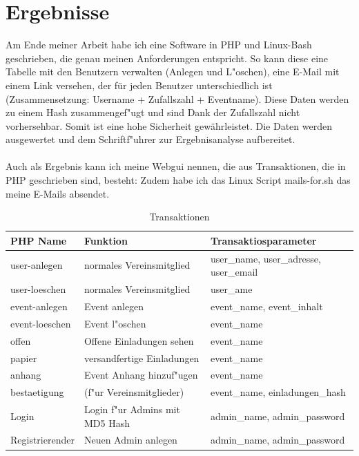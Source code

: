 \documentclass[12pt,twoside]{article}  %
\begin{document}
  \section{Ergebnisse} %
    Am Ende meiner Arbeit habe
    ich eine Software in PHP und Linux-Bash geschrieben, die genau meinen Anforderungen entspricht. 
    So kann diese eine Tabelle mit den Benutzern verwalten (Anlegen und L"oschen), eine E-Mail mit einem 
    Link versehen, der für jeden Benutzer unterschiedlich ist (Zusammensetzung: Username + Zufallszahl 
    + Eventname). Diese Daten werden zu einem Hash zusammengef"ugt und sind Dank der Zufallszahl nicht 
    vorhersehbar. Somit ist eine hohe Sicherheit gewährleistet. Die Daten werden ausgewertet und dem 
    Schriftf"uhrer zur Ergebnisanalyse aufbereitet. \\ \\
    Auch als Ergebnis kann ich meine Webgui nennen, die aus Transaktionen, die in PHP geschrieben sind, besteht:
    Zudem habe ich das Linux Script mails-for.sh das meine E-Mails absendet. \\
    \begin{table}
    \begin{tabular}{|l|l|l}
    PHP Name & \bf Funktion & \bf Transaktiosparameter \\
    \hline
    user-anlegen    &     normales Vereinsmitglied                                          & user\_name, user\_adresse, user\_email \\
    user-loeschen   &     normales Vereinsmitglied                                          & user\_ame \\
    event-anlegen   &     Event anlegen                                                    & event\_name, event\_inhalt \\
    event-loeschen  &     Event l"oschen						    & event\_name \\
    offen           &     Offene Einladungen sehen 					    & event\_name \\
    papier          &     versandfertige Einladungen 			    		    & event\_name \\   %
    anhang          &     Event Anhang hinzuf"ugen 					    & event\_name \\
    bestaetigung    &     (f"ur Vereinsmitglieder)	 				   & event\_name, einladungen\_hash \\ %
    Login           &     Login f"ur Admins mit MD5 Hash                                    & admin\_name, admin\_password \\ %
    Registrierender &     Neuen Admin anlegen                                               & admin\_name, admin\_password \\  %
    \end{tabular}
    \caption{Transaktionen}
    \end{table}
   
\end{document}
